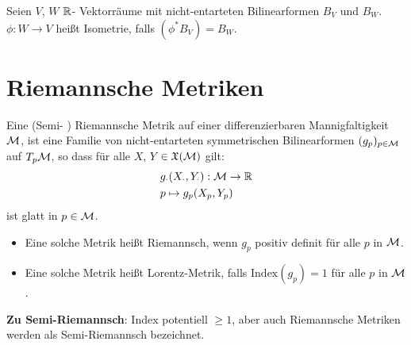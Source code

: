 \begin{defs}[Isometrie]
Seien $V$, $W$ $\mathbb{R}$- Vektorräume mit nicht-entarteten Bilinearformen $B_V$ und $B_W$.
$\phi: W \to V$ heißt Isometrie, falls $(\phi^\ast B_V) = B_W$.
\end{defs}

\section{Riemannsche Metriken}

\begin{defs}
Eine (Semi- ) Riemannsche Metrik auf einer differenzierbaren Mannigfaltigkeit $\mathcal{M}$, ist eine Familie von nicht-entarteten symmetrischen Bilinearformen 
$(g_p)_{p \in \mathcal{M}}$ auf $T_p \mathcal{M}$, so dass für alle $X$, $Y$ $\in \mathfrak{X}(\mathcal{M})$ gilt:
\begin{align}
&g_{\cdot} (X_\cdot, Y_\cdot): \mathcal{M} \to \mathbb{R} \\
& p \mapsto g_p (X_p, Y_p)
\end{align}
ist glatt in $p \in \mathcal{M}$.
\end{defs}


\begin{bem}\leavevmode
\begin{itemize}
\item Eine solche Metrik heißt Riemannsch, wenn $g_p$ positiv definit für alle $p$ in $\mathcal{M}$.
\item Eine solche Metrik heißt Lorentz-Metrik, falls $\mathrm{Index} (g_p) = 1$ für alle $p$ in $\mathcal{M}$.
\end{itemize}
\end{bem}

\textbf{Zu Semi-Riemannsch}:
Index potentiell $\geq 1$, aber auch Riemannsche Metriken werden als Semi-Riemannsch bezeichnet.



